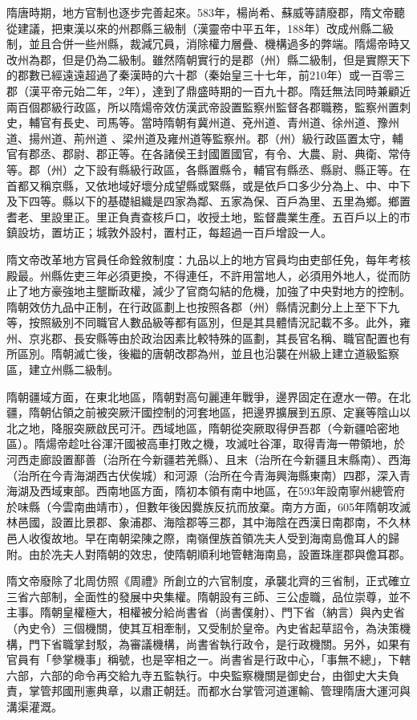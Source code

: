 隋唐時期，地方官制也逐步完善起來。583年，楊尚希、蘇威等請廢郡，隋文帝聽從建議，把東漢以來的州郡縣三級制（漢靈帝中平五年，188年）改成州縣二級制，並且合併一些州縣，裁減冗員，消除權力層疊、機構過多的弊端。隋煬帝時又改州為郡，但是仍為二級制。雖然隋朝實行的是郡（州）縣二級制，但是實際天下的郡數已經遠遠超過了秦漢時的六十郡（秦始皇三十七年，前210年）或一百零三郡（漢平帝元始二年，2年），達到了鼎盛時期的一百九十郡。隋廷無法同時兼顧近兩百個郡級行政區，所以隋煬帝效仿漢武帝設置監察州監督各郡職務，監察州置刺史，輔官有長史、司馬等。當時隋朝有冀州道、兗州道、青州道、徐州道、豫州道、揚州道、荊州道 、梁州道及雍州道等監察州。郡（州）級行政區置太守，輔官有郡丞、郡尉、郡正等。在各諸侯王封國置國官，有令、大農、尉、典衛、常侍等。郡（州）之下設有縣級行政區，各縣置縣令，輔官有縣丞、縣尉、縣正等。在首都又稱京縣，又依地域好壞分成望縣或緊縣，或是依戶口多少分為上、中、中下及下四等。縣以下的基礎組織是四家為鄰、五家為保、百戶為里、五里為鄉。鄉置耆老、里設里正。里正負責查核戶口，收授土地，監督農業生產。五百戶以上的市鎮設坊，置坊正；城敦外設村，置村正，每超過一百戶增設一人。

隋文帝改革地方官員任命銓敘制度：九品以上的地方官員均由吏部任免，每年考核殿最。州縣佐吏三年必須更換，不得連任，不許用當地人，必須用外地人，從而防止了地方豪強地主壟斷政權，減少了官商勾結的危機，加強了中央對地方的控制。隋朝效仿九品中正制，在行政區劃上也按照各郡（州）縣情況劃分上上至下下九等，按照級別不同職官人數品級等都有區別，但是其具體情況記載不多。此外，雍州、京兆郡、長安縣等由於政治因素比較特殊的區劃，其長官名稱、職官配置也有所區別。隋朝滅亡後，後繼的唐朝改郡為州，並且也沿襲在州級上建立道級監察區，建立州縣二級制。

隋朝疆域方面，在東北地區，隋朝對高句麗連年戰爭，邊界固定在遼水一帶。在北疆，隋朝佔領之前被突厥汗國控制的河套地區，把邊界擴展到五原、定襄等陰山以北之地，降服突厥啟民可汗。西域地區，隋朝從突厥取得伊吾郡（今新疆哈密地區）。隋煬帝趁吐谷渾汗國被高車打敗之機，攻滅吐谷渾，取得青海一帶領地，於河西走廊設置鄯善（治所在今新疆若羌縣）、且末（治所在今新疆且末縣南）、西海（治所在今青海湖西古伏俟城）和河源（治所在今青海興海縣東南）四郡，深入青海湖及西域東部。西南地區方面，隋初本領有南中地區，在593年設南寧州總管府於味縣（今雲南曲靖市），但數年後因爨族反抗而放棄。南方方面，605年隋朝攻滅林邑國，設置比景郡、象浦郡、海陰郡等三郡，其中海陰在西漢日南郡南，不久林邑人收復故地。早在南朝梁陳之際，南嶺俚族首領冼夫人受到海南島儋耳人的歸附。由於冼夫人對隋朝的效忠，使隋朝順利地管轄海南島，設置珠崖郡與儋耳郡。

隋文帝廢除了北周仿照《周禮》所創立的六官制度，承襲北齊的三省制，正式確立三省六部制，全面性的發展中央集權。隋朝設有三師、三公虛職，品位崇尊，並不主事。隋朝皇權極大，相權被分給尚書省（尚書僕射）、門下省（納言）與內史省（內史令）三個機關，使其互相牽制，又受制於皇帝。內史省起草詔令，為決策機構，門下省職掌封駁，為審議機構，尚書省執行政令，是行政機關。另外，如果有官員有「參掌機事」稱號，也是宰相之一。尚書省是行政中心，「事無不總」，下轄六部，六部的命令再交給九寺五監執行。中央監察機關是御史台，由御史大夫負責，掌管邦國刑憲典章，以肅正朝廷。而都水台掌管河道運輸、管理隋唐大運河與溝渠灌溉。

